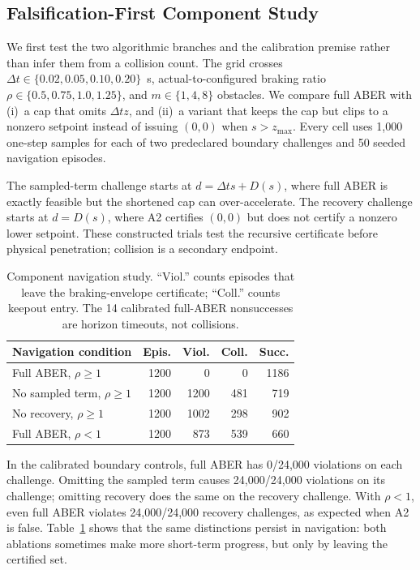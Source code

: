 \documentclass[letterpaper]{article}
\begin{document}
\subsection{Falsification-First Component Study}

We first test the two algorithmic branches and the calibration premise rather
than infer them from a collision count.  The grid crosses
$\Delta t\in\{0.02,0.05,0.10,0.20\}$~s, actual-to-configured braking ratio
$\rho\in\{0.5,0.75,1.0,1.25\}$, and $m\in\{1,4,8\}$ obstacles.  We compare
full ABER with (i)~a cap that omits $\Delta t z$, and (ii)~a variant that
keeps the cap but clips to a nonzero setpoint instead of issuing $(0,0)$ when
$s>z_{\max}$.  Every cell uses 1,000 one-step samples for each of two
predeclared boundary challenges and 50 seeded navigation episodes.

The sampled-term challenge starts at $d=\Delta t s+D(s)$, where full ABER is
exactly feasible but the shortened cap can over-accelerate.  The recovery
challenge starts at $d=D(s)$, where A2 certifies $(0,0)$ but does not certify
a nonzero lower setpoint.  These constructed trials test the recursive
certificate before physical penetration; collision is a secondary endpoint.

\begin{table}[t]
\centering
\small
\setlength{\tabcolsep}{3.0pt}
\begin{tabular}{lrrrr}
\toprule
Navigation condition & Epis. & Viol. & Coll. & Succ.\\
\midrule
Full ABER, $\rho\ge1$ & 1200 & 0 & 0 & 1186\\
No sampled term, $\rho\ge1$ & 1200 & 1200 & 481 & 719\\
No recovery, $\rho\ge1$ & 1200 & 1002 & 298 & 902\\
Full ABER, $\rho<1$ & 1200 & 873 & 539 & 660\\
\bottomrule
\end{tabular}
\caption{Component navigation study.  ``Viol.'' counts episodes that leave
the braking-envelope certificate; ``Coll.'' counts keepout entry.  The 14
calibrated full-ABER nonsuccesses are horizon timeouts, not collisions.}
\label{tab:ablation}
\end{table}

In the calibrated boundary controls, full ABER has 0/24,000 violations on
each challenge.  Omitting the sampled term causes 24,000/24,000 violations on
its challenge; omitting recovery does the same on the recovery challenge.
With $\rho<1$, even full ABER violates 24,000/24,000 recovery challenges, as
expected when A2 is false.  Table~\ref{tab:ablation} shows that the same
distinctions persist in navigation: both ablations sometimes make more
short-term progress, but only by leaving the certified set.
\end{document}
